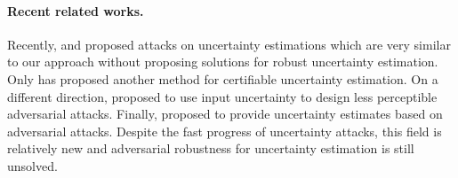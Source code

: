 \paragraph{Recent related works.} Recently, \cite{galil2021disrupting} and \cite{huimin2022attackingOOD} proposed attacks on uncertainty estimations which are very similar to our approach without proposing solutions for robust uncertainty estimation. Only \cite{meinke2021provably} has proposed another method for certifiable uncertainty estimation. On a different direction, \cite{dia2021localizeduncertainty} proposed to use input uncertainty to design less perceptible adversarial attacks. Finally, \cite{alarab2021attackucertainty} proposed to provide uncertainty estimates based on adversarial attacks. Despite the fast progress of uncertainty attacks, this field is relatively new and adversarial robustness for uncertainty estimation is still unsolved.